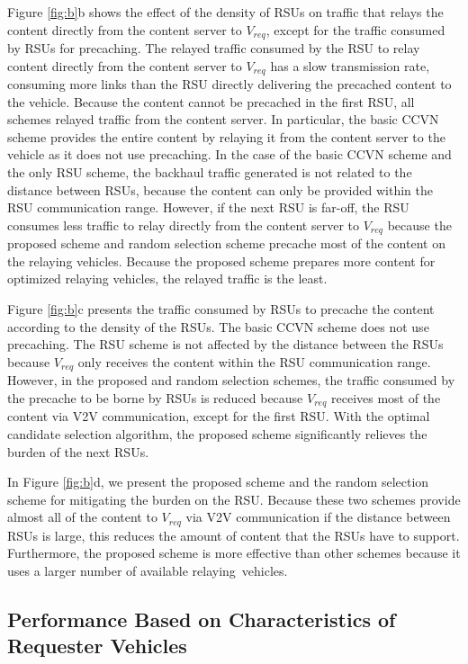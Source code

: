 \documentclass[electronics,aricle,accept,pdftex,moreauthors]{Definitions/mdpi}
\begin{document}
Figure \ref{fig:b}b shows the effect of the density of RSUs on traffic that relays the content directly from the content server to ${V}_{req}$, except for the traffic consumed by RSUs for precaching. The relayed traffic consumed by the RSU to relay content directly from the content server to ${V}_{req}$ has a slow transmission rate, consuming more links than the RSU directly delivering the precached content to the vehicle. Because the content cannot be precached in the first RSU, all schemes relayed traffic from the content server. In particular, the basic CCVN scheme provides the entire content by relaying it from the content server to the vehicle as it does not use precaching. In the case of the basic CCVN scheme and the only RSU scheme, the backhaul traffic generated is not related to the distance between RSUs, because the content can only be provided within the RSU communication range. However, if the next RSU is far-off, the RSU consumes less traffic to relay directly from the content server to ${V}_{req}$ because the proposed scheme and random selection scheme precache most of the content on the relaying vehicles. Because the proposed scheme prepares more content for optimized relaying vehicles, the relayed traffic is the least.


Figure \ref{fig:b}c presents the traffic consumed by RSUs to precache the content according to the density of the RSUs. The basic CCVN scheme does not use precaching. The RSU scheme is not affected by the distance between the RSUs because ${V}_{req}$ only receives the content within the RSU communication range. However, in the proposed and random selection schemes, the traffic consumed by the precache to be borne by RSUs is reduced because ${V}_{req}$ receives most of the content via V2V communication, except for the first RSU. With the optimal candidate selection algorithm, the proposed scheme significantly relieves the burden of the next RSUs.

In Figure \ref{fig:b}d, we present the proposed scheme and the random selection scheme for mitigating the burden on the RSU. Because these two schemes provide almost all of the content to ${V}_{req}$ via V2V communication if the distance between RSUs is large, this reduces the amount of content that the RSUs have to support. Furthermore, the proposed scheme is more effective than other schemes because it uses a larger number of available relaying~vehicles.


\subsection{Performance Based on Characteristics of Requester Vehicles} \label{sec5.3}
\end{document}
